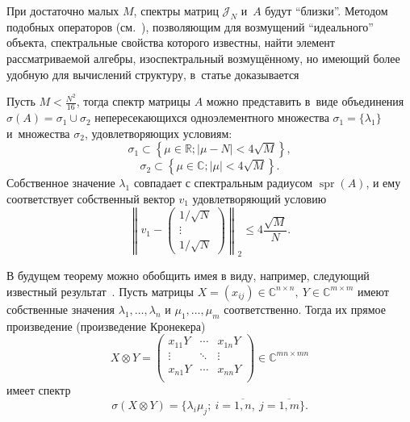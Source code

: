 При достаточно малых \( M \),
 спектры матриц \( \mathcal{J}_N \) и~\( A \) будут ``близки''.
Методом подобных операторов (см.~\cite{baskakov-harmonic,baskakov1983}),
 позволяющим для возмущений ``идеального'' объекта, спектральные свойства которого известны,
 найти элемент рассматриваемой алгебры, изоспектральный возмущ\"енному,
 но имеющий более удобную для вычислений структуру,
 в~статье доказывается
\begin{thm}\label{kozlukovsv:thm:almost-all-ones}
    Пусть \( M < \frac{N^2}{16} \),
    тогда спектр матрицы \( A \) можно представить в~виде
    объединения \( \sigma\left(A\right) = \sigma_1 \cup \sigma_2 \)
    непересекающихся
    одноэлементного множества \( \sigma_1=\{\lambda_1\} \)
    и~множества \( \sigma_2 \), удовлетворяющих условиям:
    \[ \sigma_1 \subset \left\{ \mu\in\mathbb{R}; \lvert \mu - N \rvert < 4\sqrt{M} \right\}, \]
    \[ \sigma_2 \subset \left\{ \mu\in\mathbb{C}; \lvert \mu \rvert < 4\sqrt{M} \right\}. \]
    Собственное значение \( \lambda_1 \) совпадает с спектральным радиусом
    \( \operatorname{spr}(A) \),
    и ему соответствует собственный вектор \( v_1 \)
    удовлетворяющий условию
    \[ \left\|v_1 - 
    \begin{pmatrix} 1/\sqrt{N}\\ \vdots \\ 1/\sqrt{N}\end{pmatrix}\right\|_2
        \leq 4\frac{\sqrt{M}}{N}. \]
\end{thm}

В будущем теорему можно обобщить имея в виду, например,
следующий известный результат~\cite{bellman-matrices-kron}.
Пусть матрицы \( X{=}(x_{ij})\in\mathbb{C}^{n\times n},\ Y\in\mathbb{C}^{m\times m} \)
имеют собственные значения
\( \lambda_1, \ldots, \lambda_n \)
и \( \mu_1, \ldots, \mu_m \) соответственно.
Тогда их прямое произведение (произведение Кронекера)
\[
    X\otimes Y =
    \begin{pmatrix}
        x_{11} Y & \cdots & x_{1n} Y \\
        \vdots & \ddots & \vdots \\
        x_{n1} Y & \cdots & x_{nn} Y \\
    \end{pmatrix}\in\mathbb{C}^{mn\times mn}
    \]
имеет спектр
\[
    \sigma(X\otimes Y) = \{ \lambda_i \mu _j;\ i=\overline{1,n},\ j=\overline{1,m} \}.
    \]
